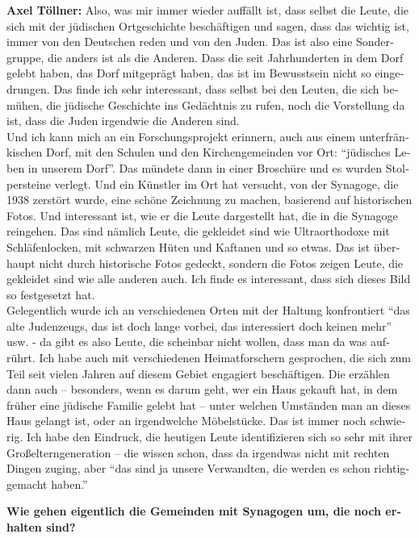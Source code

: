 \begin{otherlanguage}{ngerman}
\textbf{Axel Töllner:} Also, was mir immer wieder auffällt ist, dass selbst die Leute, die sich mit der jüdischen Ortgeschichte beschäftigen und sagen, dass das wichtig ist, immer von den Deutschen reden und von den Juden. Das ist also eine Sondergruppe, die anders ist als die Anderen. Dass die seit Jahrhunderten in dem Dorf gelebt haben, das Dorf mitgeprägt haben, das ist im Bewusstsein nicht so eingedrungen. Das finde ich sehr interessant, dass selbst bei den Leuten, die sich bemühen, die jüdische Geschichte ins Gedächtnis zu rufen, noch die Vorstellung da ist, dass die Juden irgendwie die Anderen sind.\\  
Und ich kann mich an ein Forschungsprojekt erinnern, auch aus einem unterfränkischen Dorf, mit den Schulen und den Kirchengemeinden vor Ort: "`jüdisches Leben in unserem Dorf"'. Das mündete dann in einer Broschüre und es wurden Stolpersteine verlegt. Und ein Künstler im Ort hat versucht, von der Synagoge, die 1938 zerstört wurde, eine schöne Zeichnung zu machen, basierend auf historischen Fotos. Und interessant ist, wie er die Leute dargestellt hat, die in die Synagoge reingehen. Das sind nämlich Leute, die gekleidet sind wie Ultraorthodoxe mit Schläfenlocken, mit schwarzen Hüten und Kaftanen und so etwas. Das ist überhaupt nicht durch historische Fotos gedeckt, sondern die Fotos zeigen Leute, die gekleidet sind wie alle anderen auch. Ich finde es interessant, dass sich dieses Bild so festgesetzt hat.\\ 
Gelegentlich wurde ich an verschiedenen Orten mit der Haltung konfrontiert "`das alte Judenzeugs, das ist doch lange vorbei, das interessiert doch keinen mehr"' usw. - da gibt es also Leute, die scheinbar nicht wollen, dass man da was aufrührt. Ich habe auch mit verschiedenen Heimatforschern gesprochen, die sich zum Teil seit vielen Jahren auf diesem Gebiet engagiert beschäftigen. Die erzählen dann auch – besonders, wenn es darum geht, wer ein Haus gekauft hat, in dem früher eine jüdische Familie gelebt hat – unter welchen Umständen man an dieses Haus gelangt ist, oder an irgendwelche Möbelstücke. Das ist immer noch schwierig.  
Ich habe den Eindruck, die heutigen Leute identifizieren sich so sehr mit ihrer Großelterngeneration – die wissen schon, dass da irgendwas nicht mit rechten Dingen zuging, aber "`das sind ja unsere Verwandten, die werden es schon richtiggemacht haben."' 

\textbf{Wie gehen eigentlich die Gemeinden mit Synagogen um, die noch erhalten sind?} 


\end{otherlanguage}
